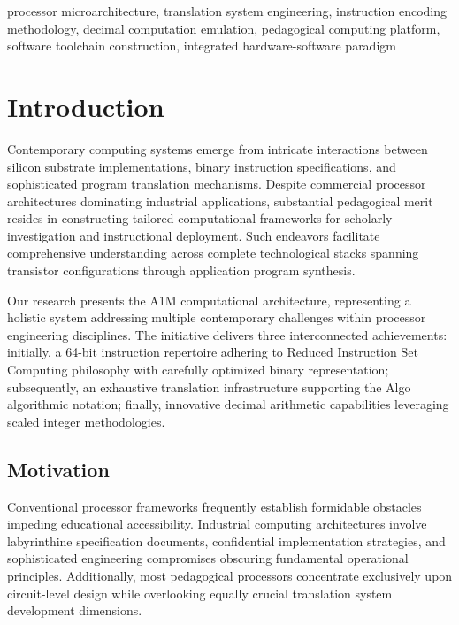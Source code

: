 \documentclass[conference,10pt,twocolumn]{IEEEtran}
\begin{document}
\begin{IEEEkeywords}
processor microarchitecture, translation system engineering, instruction encoding methodology, decimal computation emulation, pedagogical computing platform, software toolchain construction, integrated hardware-software paradigm
\end{IEEEkeywords}

\section{Introduction}

Contemporary computing systems emerge from intricate interactions between silicon substrate implementations, binary instruction specifications, and sophisticated program translation mechanisms. Despite commercial processor architectures dominating industrial applications, substantial pedagogical merit resides in constructing tailored computational frameworks for scholarly investigation and instructional deployment. Such endeavors facilitate comprehensive understanding across complete technological stacks spanning transistor configurations through application program synthesis.

Our research presents the A1M computational architecture, representing a holistic system addressing multiple contemporary challenges within processor engineering disciplines. The initiative delivers three interconnected achievements: initially, a 64-bit instruction repertoire adhering to Reduced Instruction Set Computing philosophy with carefully optimized binary representation; subsequently, an exhaustive translation infrastructure supporting the Algo algorithmic notation; finally, innovative decimal arithmetic capabilities leveraging scaled integer methodologies.

\subsection{Motivation}

Conventional processor frameworks frequently establish formidable obstacles impeding educational accessibility. Industrial computing architectures involve labyrinthine specification documents, confidential implementation strategies, and sophisticated engineering compromises obscuring fundamental operational principles. Additionally, most pedagogical processors concentrate exclusively upon circuit-level design while overlooking equally crucial translation system development dimensions.
\end{document}
